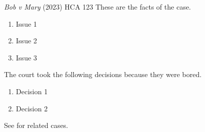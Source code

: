 \begin{casedetails}{\textit{Bob v Mary} (2023) HCA 123}
    {These are the facts of the case.}
    {\begin{enumerate}
        \item Issue 1
        \item Issue 2
        \item Issue 3
    \end{enumerate}}
    {The court took the following decisions because they were bored.
    \begin{enumerate}
        \item Decision 1
        \item Decision 2
    \end{enumerate}}
    {See  for related cases.}
\end{casedetails}